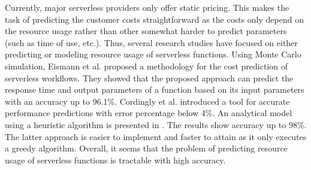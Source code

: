 Currently, major serverless providers only offer static pricing. This makes the task of predicting the customer costs straightforward as the costs only depend on the resource usage rather than other somewhat harder to predict parameters (such as time of use, etc.). Thus, several research studies have focused on either predicting or modeling resource usage of serverless functions. Using Monte Carlo simulation, Eismann et al.  proposed a methodology for the cost prediction of serverless workflows. They showed that the proposed approach can predict the response time and output parameters of a function based on its input parameters with an accuracy up to 96.1\%. Cordingly et al.  introduced a tool for accurate performance predictions with error percentage below 4\%. An analytical model using a heuristic algorithm is presented in . The results show accuracy up to 98\%. The latter approach is easier to implement and faster to attain as it only executes a greedy algorithm. Overall, it seems that the problem of predicting resource usage of serverless functions is tractable with high accuracy.

